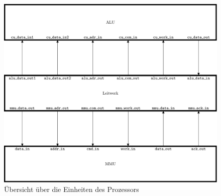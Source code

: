 
\begin{figure}[H]
\includegraphics[width=\textwidth]{./appendix/img/units.pdf}
\caption[\"Ubersicht \"uber die Einheiten des Prozessors]{\"Ubersicht \"uber die Einheiten des Prozessors}
\label{fig:units}
\end{figure}
